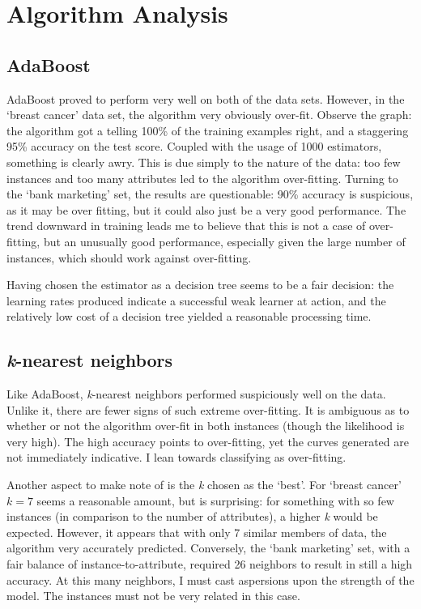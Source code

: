 \section{Algorithm Analysis}

\subsection{AdaBoost}

AdaBoost proved to perform very well on both of the data sets. However, in the `breast cancer' data set, the algorithm very obviously over-fit. Observe the graph: the algorithm got a telling 100\% of the training examples right, and a staggering 95\% accuracy on the test score. Coupled with the usage of 1000 estimators, something is clearly awry. This is due simply to the nature of the data: too few instances and too many attributes led to the algorithm over-fitting. Turning to the `bank marketing' set, the results are questionable: 90\% accuracy is suspicious, as it may be over fitting, but it could also just be a very good performance. The trend downward in training leads me to believe that this is not a case of over-fitting, but an unusually good performance, especially given the large number of instances, which should work against over-fitting.

Having chosen the estimator as a decision tree seems to be a fair decision: the learning rates produced indicate a successful weak learner at action, and the relatively low cost of a decision tree yielded a reasonable processing time.

\subsection{\textit{k}-nearest neighbors}

Like AdaBoost, \textit{k}-nearest neighbors performed suspiciously well on the data. Unlike it, there are fewer signs of such extreme over-fitting. It is ambiguous as to whether or not the algorithm over-fit in both instances (though the likelihood is very high). The high accuracy points to over-fitting, yet the curves generated are not immediately indicative. I lean towards classifying as over-fitting.

Another aspect to make note of is the \textit{k} chosen as the `best'. For `breast cancer' $k=7$ seems a reasonable amount, but is surprising: for something with so few instances (in comparison to the number of attributes), a higher \textit{k} would be expected. However, it appears that with only 7 similar members of data, the algorithm very accurately predicted. Conversely, the `bank marketing' set, with a fair balance of instance-to-attribute, required 26 neighbors to result in still a high accuracy. At this many neighbors, I must cast aspersions upon the strength of the model. The instances must not be very related in this case.


